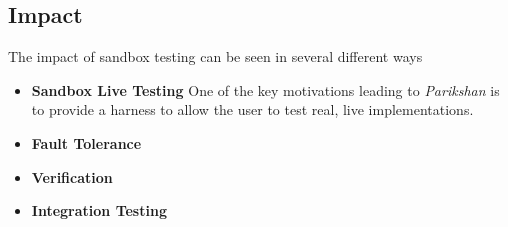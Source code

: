 \subsection{Impact}
\label{sec:impact}

The impact of sandbox testing can be seen in several different ways

\begin{itemize}
  \item \textbf{Sandbox Live Testing}
    One of the key motivations leading to \emph{Parikshan} is to provide a harness to allow the user to test real, live implementations. 


  \item \textbf{Fault Tolerance}
  \item \textbf{Verification}
  \item \textbf{Integration Testing}
\end{itemize}
